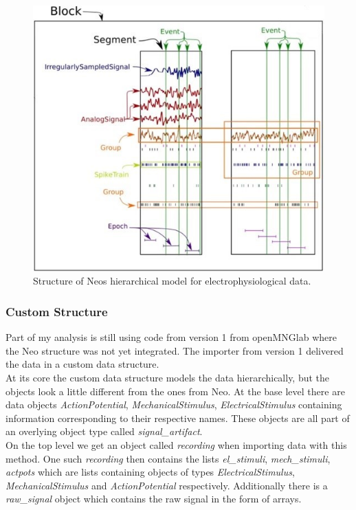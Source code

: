 \begin{figure}
	\includegraphics[width = \textwidth]{src/pic/neo_structure}
	\caption{Structure of Neos hierarchical model for electrophysiological data.}
	\label{fig:neostructure}
\end{figure}

\subsubsection{Custom Structure}
Part of my analysis is still using code from version 1 from openMNGlab where the Neo structure was not yet integrated. The importer from version 1 delivered the data in a custom data structure.\\
At its core the custom data structure models the data hierarchically, but the objects look a little different from the ones from Neo. At the base level there are data objects \textit{ActionPotential}, \textit{MechanicalStimulus}, \textit{ElectricalStimulus} containing information corresponding to their respective names. These objects are all part of an overlying object type called \textit{signal\_artifact}.\\
On the top level we get an object called \textit{recording} when importing data with this method. One such \textit{recording} then contains the lists \textit{el\_stimuli}, \textit{mech\_stimuli}, \textit{actpots} which are lists containing objects of types \textit{ElectricalStimulus}, \textit{MechanicalStimulus} and \textit{ActionPotential} respectively. Additionally there is a \textit{raw\_signal} object which contains the raw signal in the form of arrays.


